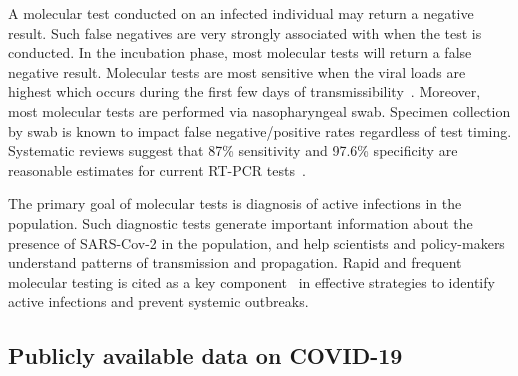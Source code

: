 \documentclass[11pt]{amsart}
\numberwithin{equation}{section}
\theoremstyle{plain}
\begin{document}
A molecular test conducted on an infected individual may return a negative result.  Such false negatives are very strongly associated with when the test is conducted.  In the incubation phase, most molecular tests will return a false negative result.  Molecular tests are most sensitive when the viral loads are highest which occurs during the first few days of transmissibility~\citep{Mina2020}.   Moreover, most molecular tests are performed via nasopharyngeal swab.  Specimen collection by swab is known to impact false negative/positive rates regardless of test timing.   Systematic reviews suggest that 87\% sensitivity and 97.6\% specificity are reasonable estimates for current RT-PCR tests~\cite{Arevalo2020, Woloshin2020,Cohen2020}.

The primary goal of molecular tests is diagnosis of active infections in the population.  Such diagnostic tests generate important information about the presence of SARS-Cov-2 in the population, and help scientists and policy-makers understand patterns of transmission and propagation. Rapid and frequent molecular testing is cited as a key component~\cite{OECD2021} in effective strategies to identify active infections and prevent systemic outbreaks.



\subsection{Publicly available data on COVID-19}
\label{subsection:testinginfo}
\end{document}
